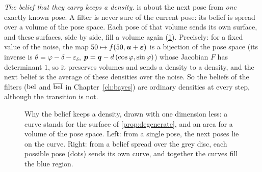 \emph{The belief that they carry keeps a density.}
 is about the next pose from \emph{one} exactly
known pose. A filter is never sure of the current pose: its belief is
spread over a volume of the pose space. Each pose of that volume sends its
own surface, and these surfaces, side by side, fill a volume again
(\cref{fig:spread}). Precisely: for a fixed value of the noise, the map
$50\mapsto f(50,\bm{u}+\bm{\varepsilon})$ is a bijection of the pose space (its
inverse is $\theta=\varphi-\delta-\varepsilon_\delta$,
$\bm{p}=\bm{q}-d\,(\cos\varphi,\sin\varphi)$) whose Jacobian $F$ has determinant
$1$, so it preserves volumes and sends a density to a density, and the next belief
is the average of these densities over the noise. So the beliefs of the
filters ($\operatorname{bel}$ and $\overline{\operatorname{bel}}$ in Chapter~\ref{ch:bayes}) are ordinary
densities at every step, although the transition is not.

\begin{figure}[ht]
\centering
{}
\caption{Why the belief keeps a density, drawn with one dimension less: a
curve stands for the surface of \cref{prop:degenerate}, and an area for a
volume of the pose space. Left: from a single pose, the next poses lie on
the curve. Right: from a belief spread over the grey disc, each possible
pose (dots) sends its own curve, and together the curves fill the blue
region.}
\label{fig:spread}
\end{figure}

